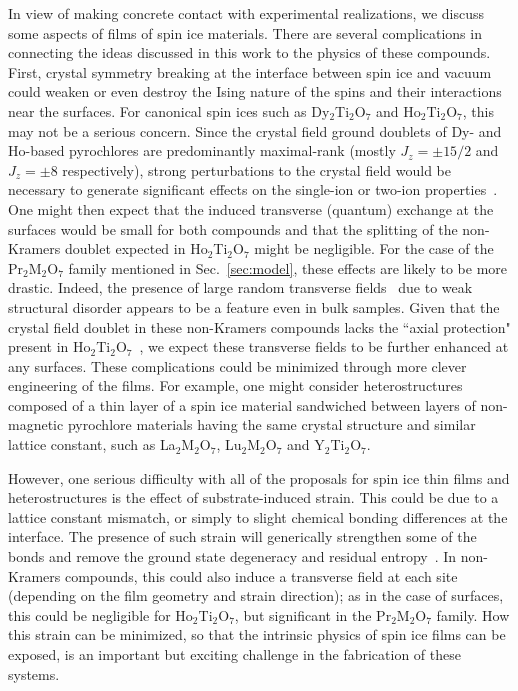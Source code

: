 \documentclass[aps,prx,reprint,runinaddress,superscriptaddress,amsmath,amssymb,floatfix,longbibliography]{revtex4-1}
\newcommand{\abo}[2]{{#1}$_2${#2}$_2$O$_7$}
\begin{document}
In view of making concrete contact with experimental realizations, we discuss some aspects of films of spin ice materials. There are several complications in connecting the ideas discussed in this work to the physics of these compounds. First, crystal symmetry breaking at the interface between spin ice and vacuum could weaken or even destroy the Ising nature of the spins and their interactions~\cite{RauPRB2015} near the surfaces. For canonical spin ices such as \abo{Dy}{Ti} and \abo{Ho}{Ti}, this may not be a serious concern. Since the crystal field ground doublets of Dy- and Ho-based pyrochlores are predominantly maximal-rank (mostly $J_z = \pm 15/2$ and $J_z = \pm 8$ respectively), strong perturbations to the crystal field would be necessary to generate significant effects on the single-ion or two-ion properties~\cite{RauPRB2015}. One might then expect that the induced transverse (quantum) exchange at the surfaces would be small for both compounds and that the splitting of the non-Kramers doublet expected in \abo{Ho}{Ti} might be negligible. For the case of the \abo{Pr}{M} family mentioned in Sec.~\ref{sec:model}, these effects are likely to be more drastic. Indeed, the presence of large random transverse fields~\cite{Wen2017} due to weak structural disorder appears to be a feature even in bulk samples. Given that the crystal field doublet in these non-Kramers compounds lacks the ``axial protection" present in \abo{Ho}{Ti}~\cite{RauPRB2015}, we expect these transverse fields to be further enhanced at any surfaces. These complications could be minimized through more clever engineering of the films. For example, one might consider heterostructures composed of a thin layer of a spin ice material sandwiched between layers of non-magnetic pyrochlore materials having the same crystal structure and similar lattice constant, such as \abo{La}{M}, \abo{Lu}{M} and \abo{Y}{Ti}.

However, one serious difficulty with all of the proposals for spin ice thin films and heterostructures is the effect of substrate-induced strain. This could be due to a lattice constant mismatch, or simply to slight chemical bonding differences at the interface. The presence of such strain will generically strengthen some of the bonds and remove the ground state degeneracy and residual entropy~\cite{Jaubert2010,Jaubert2016}. In non-Kramers compounds, this could also induce a transverse field at each site (depending on the film geometry and strain direction); as in the case of surfaces, this could be negligible for \abo{Ho}{Ti}, but significant in the \abo{Pr}{M} family. How this strain can be minimized, so that the intrinsic physics of spin ice films can be exposed, is an important but exciting challenge in the fabrication of these systems. 
\end{document}

